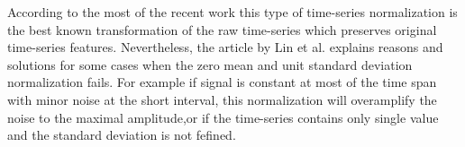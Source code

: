 According to the most of the recent work \cite{citeulike:3815880} \cite{citeulike:2821475} \cite{citeulike:3978002} this type of time-series normalization is the best known transformation of the raw time-series which preserves original time-series features. Nevertheless, the article by Lin et al. \cite{citeulike:2821475} explains reasons and solutions for some cases when the zero mean and unit standard deviation normalization fails. For example if signal is constant at most of the time span with minor noise at the short interval, this normalization will overamplify the noise to the maximal amplitude,or if the time-series contains only single value and the standard deviation is not fefined.